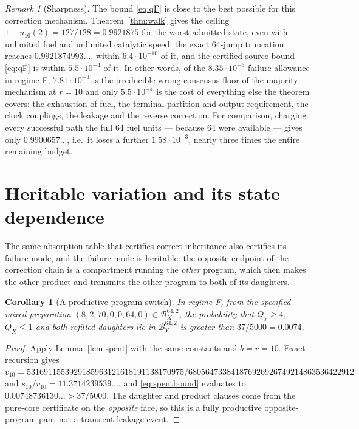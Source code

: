 \documentclass[11pt,a4paper]{article}
\theoremstyle{plain}
\newtheorem{corollary}[theorem]{Corollary}
\theoremstyle{definition}
\theoremstyle{remark}
\newtheorem{remark}[theorem]{Remark}
\newcommand{\B}{\mathcal B}
\begin{document}
\begin{remark}[Sharpness]\label{rem:sharp}
The bound \eqref{eq:qF} is close to the best possible for this correction mechanism.
Theorem~\ref{thm:walk} gives the ceiling $1-u_{10}(2)=127/128=0.9921875$ for the worst
admitted state, even with unlimited fuel and unlimited catalytic speed; the exact
$64$-jump truncation reaches $0.9921874993\ldots$, within $6.4\cdot10^{-10}$ of it, and
the certified source bound \eqref{eq:qF} is within $5.5\cdot10^{-4}$ of it. In other
words, of the $8.35\cdot10^{-3}$ failure allowance in regime F, $7.81\cdot10^{-3}$ is the
irreducible wrong-consensus floor of the majority mechanism at $r=10$ and only
$5.5\cdot10^{-4}$ is the cost of everything else the theorem covers: the exhaustion of
fuel, the terminal partition and output requirement, the clock couplings, the leakage and
the reverse correction. For comparison, charging every successful path the full $64$ fuel
units --- because $64$ were available --- gives only $0.9900657\ldots$, i.e.\ it loses a
further $1.58\cdot10^{-3}$, nearly three times the entire remaining budget.
\end{remark}

\section{Heritable variation and its state dependence}\label{sec:variation}

The same absorption table that certifies correct inheritance also certifies its failure
mode, and the failure mode is heritable: the opposite endpoint of the correction chain is
a compartment running the \emph{other} program, which then makes the other product and
transmits the other program to both of its daughters.

\begin{corollary}[A productive program switch]\label{cor:flip}
In regime F, from the specified mixed preparation $(8,2,70,0,0,64,0)\in\B_X^{64,2}$, the
probability that $Q_Y\ge4$, $Q_X\le1$ and both refilled daughters lie in $\B_Y^{64,2}$ is
greater than $37/5000=0.0074$.
\end{corollary}

\begin{proof}
Apply Lemma~\ref{lem:spent} with the same constants and $b=r=10$. Exact recursion gives
$v_{10}=5316911553929185963121618191138170975/680564733841876926926749214863536422912$
and $s_{10}/v_{10}=11.3714239539\ldots$, and \eqref{eq:spentbound} evaluates to
$0.00748736130\ldots>37/5000$. The daughter and product clauses come from the pure-core
certificate on the \emph{opposite} face, so this is a fully productive opposite-program
pair, not a transient leakage event.
\end{proof}
\end{document}
